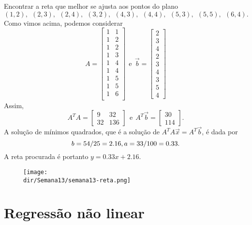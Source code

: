\documentclass[../livro.tex]{subfiles}  %
\providecommand{\dir}{..}
\begin{document}
\begin{example}
  Encontrar a reta que melhor se ajusta aos pontos do plano
  \[
  (1,2), \ \ (2,3), \ \ (2,4), \ \ (3,2), \ \ (4,3), \ \ (4,4), \ \ (5,3), \ \ (5,5), \ \ (6,4).
  \] Como vimos acima, podemos considerar
  \[
  A =
  \begin{bmatrix}
    1 & 1 \\
    1 & 2 \\
    1 & 2 \\
    1 & 3 \\
    1 & 4 \\
    1 & 4 \\
    1 & 5 \\
    1 & 5 \\
    1 & 6 \\
  \end{bmatrix} \ \ \text{e} \ \
  \vec{b} =
  \begin{bmatrix}
    2\\3\\4\\2\\3\\4\\3\\5\\4
  \end{bmatrix}
  \] Assim,
  \[
  A^T A =
  \begin{bmatrix}
    9  & 32  \\
    32  & 136
  \end{bmatrix}  \ \ \text{e} \ \
  A^T \vec{b} =
  \begin{bmatrix}
    30\\114
  \end{bmatrix}.
  \] A solução de mínimos quadrados, que é a solução de $A^T A \vec{x} = A^T\vec{b}$, é dada por
  \[
  b = 54/25 = 2.16, \\ a = 33/100 = 0.33.
  \] A reta procurada é portanto $y = 0.33 x + 2.16$.
  \begin{figure}[h!]
    \begin{center}
      \texttt{[image: \\dir/Semana13/semana13-reta.png]}
    \end{center}
  \end{figure}
\end{example}


\section{Regressão não linear}
\end{document}

